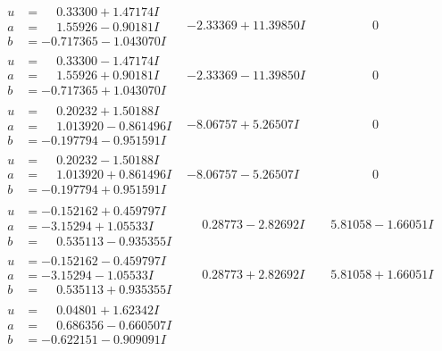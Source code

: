 \documentclass[1p]{elsarticle_modified}
\theoremstyle{definition}
\begin{document}
$$\begin{array}{c|c|c}
\begin{aligned}
u &= \phantom{-}0.33300 + 1.47174 I \\
a &= \phantom{-}1.55926 - 0.90181 I \\
b &= -0.717365 - 1.043070 I\end{aligned}
 & -2.33369 + 11.39850 I & \phantom{-0.000000 } 0 \\ \hline\begin{aligned}
u &= \phantom{-}0.33300 - 1.47174 I \\
a &= \phantom{-}1.55926 + 0.90181 I \\
b &= -0.717365 + 1.043070 I\end{aligned}
 & -2.33369 - 11.39850 I & \phantom{-0.000000 } 0 \\ \hline\begin{aligned}
u &= \phantom{-}0.20232 + 1.50188 I \\
a &= \phantom{-}1.013920 - 0.861496 I \\
b &= -0.197794 - 0.951591 I\end{aligned}
 & -8.06757 + 5.26507 I & \phantom{-0.000000 } 0 \\ \hline\begin{aligned}
u &= \phantom{-}0.20232 - 1.50188 I \\
a &= \phantom{-}1.013920 + 0.861496 I \\
b &= -0.197794 + 0.951591 I\end{aligned}
 & -8.06757 - 5.26507 I & \phantom{-0.000000 } 0 \\ \hline\begin{aligned}
u &= -0.152162 + 0.459797 I \\
a &= -3.15294 + 1.05533 I \\
b &= \phantom{-}0.535113 - 0.935355 I\end{aligned}
 & \phantom{-}0.28773 - 2.82692 I & \phantom{-}5.81058 - 1.66051 I \\ \hline\begin{aligned}
u &= -0.152162 - 0.459797 I \\
a &= -3.15294 - 1.05533 I \\
b &= \phantom{-}0.535113 + 0.935355 I\end{aligned}
 & \phantom{-}0.28773 + 2.82692 I & \phantom{-}5.81058 + 1.66051 I \\ \hline\begin{aligned}
u &= \phantom{-}0.04801 + 1.62342 I \\
a &= \phantom{-}0.686356 - 0.660507 I \\
b &= -0.622151 - 0.909091 I\end{aligned}

\end{array}$$
\end{document}
